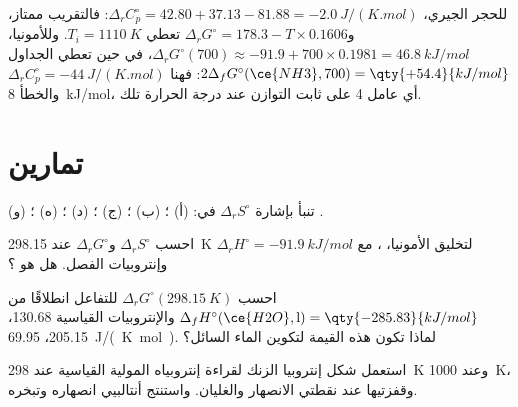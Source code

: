 \begin{example}\label{ex:b2:reaction-free-energy:tests}
للحجر الجيري، $\Delta_r C^\circ_p = 42.80 + 37.13 - 81.88 =
\qty{-2.0}{J/(K.mol)}$: فالتقريب ممتاز، و$\Delta_r
G^\circ = 178.3 - T \times 0.1606$ تعطي $T_i = \qty{1110}{K}$. وللأمونيا،
$\Delta_r G^\circ(700) \approx -91.9 + 700 \times 0.1981 =
\qty{+46.8}{kJ/mol}$، في حين تعطي الجداول $2\Delta_f G^\circ(\ce{NH3}, 700) =
\qty{+54.4}{kJ/mol}$: فهنا $\Delta_r C^\circ_p = \qty{-44}{J/(K.mol)}$ والخطأ
\qty{8}{kJ/mol}، أي عامل 4 على ثابت التوازن عند درجة الحرارة
تلك.
\end{example}

\section{تمارين}

\begin{exercise}[$\star$]\label{exo:b2:reaction-free-energy:1}
تنبأ بإشارة $\Delta_r S^\circ$ في: (أ) ؛
(ب) ؛ (ج) ؛
(د) ؛ (ه) ؛
(و) .
\end{exercise}

\begin{exercise}[$\star$]\label{exo:b2:reaction-free-energy:2}
احسب $\Delta_r S^\circ$ و$\Delta_r G^\circ$ عند \qty{298.15}{K} لتخليق
الأمونيا، ، مع $\Delta_r
H^\circ = \qty{-91.9}{kJ/mol}$ وإنتروبيات الفصل. هل هو ؟
\end{exercise}

\begin{exercise}[$\star$]\label{exo:b2:reaction-free-energy:3}
احسب $\Delta_r G^\circ(\qty{298.15}{K})$ للتفاعل  انطلاقًا من $\Delta_f H^\circ(\ce{H2O}, \text{l}) = \qty{-285.83}{kJ/mol}$
والإنتروبيات القياسية  130.68،  205.15،
 \qty{69.95}{J/(K.mol)}. لماذا تكون هذه القيمة 
لتكوين الماء السائل؟
\end{exercise}

\begin{exercise}[$\star$]\label{exo:b2:reaction-free-energy:4}
استعمل شكل إنتروبيا الزنك لقراءة إنتروبياه المولية القياسية عند
\qty{298}{K} وعند \qty{1000}{K}، وقفزتيها عند نقطتي الانصهار والغليان.
واستنتج أنتالبيي انصهاره وتبخره.
\end{exercise}

